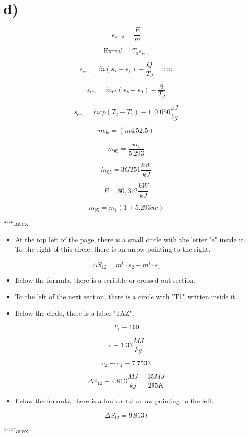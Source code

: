 

\section*{d)}

\[
\dot{e}_{x, \text{ist}} = \frac{E}{\dot{m}}
\]

\[
\text{Exreal} = T_0 s_{erz}
\]

\[
s_{erz} = \dot{m} (s_2 - s_1) - \frac{Q}{T_J} \quad 1:m
\]

\[
s_{erz} = \dot{m}_{05} (s_8 - s_0) - \frac{q}{T_J}
\]

\[
s_{erz} = \dot{m} cp (T_2 - T_1) - 110.050 \frac{kJ}{kg}
\]

\[
m_{05} = (\dot{m} 4.5 2.5)
\]

\[
m_{05} = \frac{\dot{m}_1}{5.293}
\]

\[
\dot{m}_{05} = 3 GT 5 1 \frac{kW}{kJ}
\]

\[
\dot{E} = 80,3 12 \frac{kW}{kJ}
\]

\[
m_{05} = \dot{m}_1 (1 + 5.293 nc)
\]

``````latex


\begin{itemize}
    \item At the top left of the page, there is a small circle with the letter "e" inside it. To the right of this circle, there is an arrow pointing to the right.
\end{itemize}

\[
\Delta S_{12} = m^t \cdot s_2 - m^i \cdot s_1
\]

\begin{itemize}
    \item Below the formula, there is a scribble or crossed-out section.
    \item To the left of the next section, there is a circle with "T1" written inside it.
    \item Below the circle, there is a label "TAZ".
\end{itemize}

\[
T_1 = 100
\]

\[
s = 1.33 \frac{MJ}{kg}
\]

\[
s_2 = s_3 = 7.7533
\]

\[
\Delta S_{12} = 4.813 \frac{MJ}{kg} - \frac{35 MJ}{295 K}
\]

\begin{itemize}
    \item Below the formula, there is a horizontal arrow pointing to the left.
\end{itemize}

\[
\Delta S_{12} = 9.813 \, t
\]

``````latex
